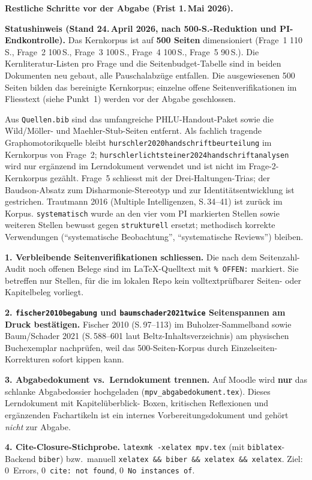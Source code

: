 \documentclass[ngerman, a4paper]{article}
\begin{document}
\begin{todomai}
\textbf{Restliche Schritte vor der Abgabe (Frist 1.\,Mai 2026).}

\medskip
\textbf{Statushinweis (Stand 24.\,April 2026, nach 500-S.-Reduktion und
PI-Endkontrolle).}
Das Kernkorpus ist auf \textbf{500 Seiten} dimensioniert (Frage~1 110\,S.,
Frage~2 100\,S., Frage~3 100\,S., Frage~4 100\,S., Frage~5 90\,S.). Die
Kernliteratur-Listen pro Frage und die Seitenbudget-Tabelle sind in beiden
Dokumenten neu gebaut, alle Pauschalabzüge entfallen. Die ausgewiesenen
500\,Seiten bilden das bereinigte Kernkorpus; einzelne offene
Seitenverifikationen im Fliesstext (siehe Punkt~1) werden vor der Abgabe
geschlossen.

Aus \texttt{Quellen.bib} sind das umfangreiche PHLU-Handout-Paket sowie die
Wild/Möller- und Maehler-Stub-Seiten entfernt. Als fachlich tragende
Graphomotorikquelle bleibt \texttt{hurschler2020handschriftbeurteilung} im
Kernkorpus von Frage~2; \texttt{hurschlerlichtsteiner2024handschriftanalysen}
wird nur ergänzend im Lerndokument verwendet und ist nicht im
Frage-2-Kernkorpus gezählt. Frage~5 schliesst mit der Drei-Haltungen-Trias;
der Baudson-Absatz zum Disharmonie-Stereotyp und zur Identitätsentwicklung
ist gestrichen. Trautmann 2016 (Multiple Intelligenzen, S.\,34--41) ist
zurück im Korpus. \texttt{systematisch} wurde an den vier vom PI markierten
Stellen sowie weiteren Stellen bewusst gegen \texttt{strukturell} ersetzt;
methodisch korrekte Verwendungen (\enquote{systematische Beobachtung},
\enquote{systematische Reviews}) bleiben.

\medskip
\textbf{1. Verbleibende Seitenverifikationen schliessen.}
Die nach dem Seitenzahl-Audit noch offenen Belege sind im LaTeX-Quelltext mit
\texttt{\% OFFEN:} markiert. Sie betreffen nur Stellen, für die im lokalen Repo kein
volltextprüfbarer Seiten- oder Kapitelbeleg vorliegt.

\medskip
\textbf{2. \texttt{fischer2010begabung} und \texttt{baumschader2021twice}
Seitenspannen am Druck bestätigen.}
Fischer 2010 (S.\,97--113) im Buholzer-Sammelband sowie Baum/Schader 2021
(S.\,588--601 laut Beltz-Inhaltsverzeichnis) am physischen Buchexemplar
nachprüfen, weil das 500-Seiten-Korpus durch Einzelseiten-Korrekturen
sofort kippen kann.

\medskip
\textbf{3. Abgabedokument vs.\ Lerndokument trennen.}
Auf Moodle wird \textbf{nur} das schlanke Abgabedossier hochgeladen
(\texttt{mpv\_abgabedokument.tex}). Dieses Lerndokument mit Kapitelüberblick-
Boxen, kritischen Reflexionen und ergänzenden Fachartikeln ist ein
internes Vorbereitungsdokument und gehört \textit{nicht} zur Abgabe.

\medskip
\textbf{4. Cite-Closure-Stichprobe.}
\verb|latexmk -xelatex mpv.tex| (mit \texttt{biblatex}-Backend
\texttt{biber}) bzw.\ manuell
\verb|xelatex && biber && xelatex && xelatex|. Ziel: 0~Errors,
0~\verb|cite: not found|, 0~\verb|No instances of|.
\end{todomai}
\end{document}
